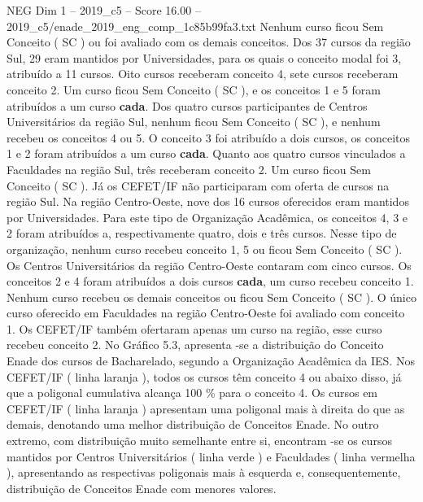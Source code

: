 \begin{textsample}{NEG Dim 1 – 2019\_c5 – Score 16.00 – 2019\_c5/enade\_2019\_eng\_comp\_1c85b99fa3.txt}
Nenhum curso ficou Sem Conceito ( SC ) ou foi avaliado com os demais conceitos.
Dos 37 cursos da região Sul, 29 eram mantidos por Universidades, para os quais o conceito modal foi 3, atribuído a 11 cursos.
Oito cursos receberam conceito 4, sete cursos receberam conceito 2.
Um curso ficou Sem Conceito ( SC ), e os conceitos 1 e 5 foram atribuídos a um curso \textbf{cada}.
Dos quatro cursos participantes de Centros Universitários da região Sul, nenhum ficou Sem Conceito ( SC ), e nenhum recebeu os conceitos 4 ou 5.
O conceito 3 foi atribuído a dois cursos, os conceitos 1 e 2 foram atribuídos a um curso \textbf{cada}.
Quanto aos quatro cursos vinculados a Faculdades na região Sul, três receberam conceito 2.
Um curso ficou Sem Conceito ( SC ).
Já os CEFET/IF não participaram com oferta de cursos na região Sul.
Na região Centro-Oeste, nove dos 16 cursos oferecidos eram mantidos por Universidades.
Para este tipo de Organização Acadêmica, os conceitos 4, 3 e 2 foram atribuídos a, respectivamente quatro, dois e três cursos.
Nesse tipo de organização, nenhum curso recebeu conceito 1, 5 ou ficou Sem Conceito ( SC ).
Os Centros Universitários da região Centro-Oeste contaram com cinco cursos.
Os conceitos 2 e 4 foram atribuídos a dois cursos \textbf{cada}, um curso recebeu conceito 1.
Nenhum curso recebeu os demais conceitos ou ficou Sem Conceito ( SC ).
O único curso oferecido em Faculdades na região Centro-Oeste foi avaliado com conceito 1.
Os CEFET/IF também ofertaram apenas um curso na região, esse curso recebeu conceito 2.
No Gráfico 5.3, apresenta -se a distribuição do Conceito Enade dos cursos de Bacharelado, segundo a Organização Acadêmica da IES.
Nos CEFET/IF ( linha laranja ), todos os cursos têm conceito 4 ou abaixo disso, já que a poligonal cumulativa alcança 100 \% para o conceito 4.
Os cursos em CEFET/IF ( linha laranja ) apresentam uma poligonal mais à direita do que as demais, denotando uma melhor distribuição de Conceitos Enade.
No outro extremo, com distribuição muito semelhante entre si, encontram -se os cursos mantidos por Centros Universitários ( linha verde ) e Faculdades ( linha vermelha ), apresentando as respectivas poligonais mais à esquerda e, consequentemente, distribuição de Conceitos Enade com menores valores.

\end{textsample}
